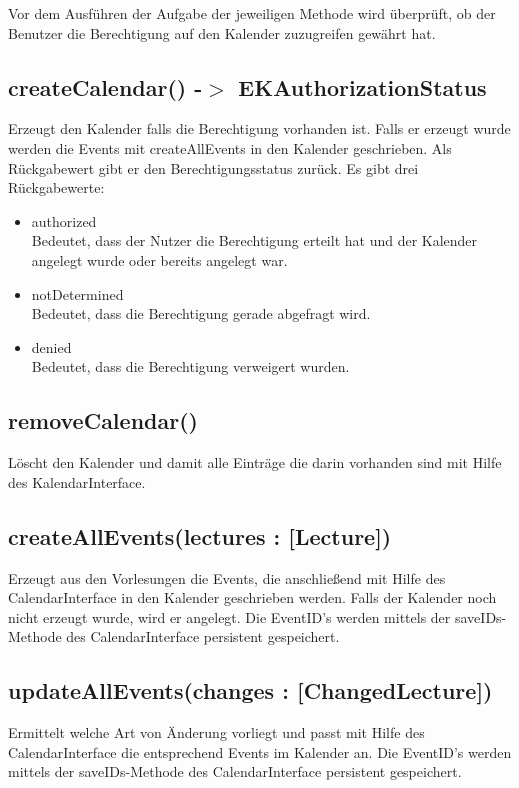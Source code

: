 Vor dem Ausführen der Aufgabe der jeweiligen Methode wird überprüft, ob der Benutzer die Berechtigung auf den Kalender zuzugreifen gewährt hat.

\subsection[createCalendar]{createCalendar() -$>$ EKAuthorizationStatus}
Erzeugt den Kalender falls die Berechtigung vorhanden ist. Falls er erzeugt wurde werden die Events mit createAllEvents in den Kalender geschrieben. Als Rückgabewert gibt er den Berechtigungsstatus zurück. Es gibt drei Rückgabewerte:
\begin{itemize}
     \item authorized \\[0.5em]
     Bedeutet, dass der Nutzer die Berechtigung erteilt hat und der Kalender angelegt wurde oder bereits angelegt war.
     \item notDetermined \\[0.5em]
     Bedeutet, dass die Berechtigung gerade abgefragt wird.
     \item denied \\[0.5em]
     Bedeutet, dass die Berechtigung verweigert wurden.
\end{itemize}

\subsection[removeCalendar]{removeCalendar()}
Löscht den Kalender und damit alle Einträge die darin vorhanden sind mit Hilfe des KalendarInterface.

\subsection[createAllEvents]{createAllEvents(lectures : [Lecture])}
Erzeugt aus den Vorlesungen die Events, die anschließend mit Hilfe des CalendarInterface in den Kalender geschrieben werden.
Falls der Kalender noch nicht erzeugt wurde, wird er angelegt.
Die EventID's werden mittels der saveIDs-Methode des CalendarInterface persistent gespeichert.

\subsection[updateAllEvents]{updateAllEvents(changes : [ChangedLecture])}
Ermittelt welche Art von Änderung vorliegt und passt mit Hilfe des CalendarInterface die  entsprechend Events im Kalender an.
Die EventID's werden mittels der saveIDs-Methode des CalendarInterface persistent gespeichert.

